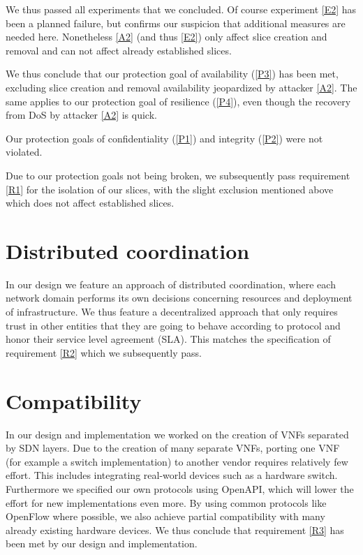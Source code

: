 We thus passed all experiments that we concluded. Of course experiment \ref{E2} has been a planned failure, but confirms our suspicion that additional measures are needed here. Nonetheless \ref{A2} (and thus \ref{E2}) only affect slice creation and removal and can not affect already established slices.

We thus conclude that our protection goal of availability (\ref{P3}) has been met, excluding slice creation and removal availability jeopardized by attacker \ref{A2}. The same applies to our protection goal of resilience (\ref{P4}), even though the recovery from DoS by attacker \ref{A2} is quick.

Our protection goals of confidentiality (\ref{P1}) and integrity (\ref{P2}) were not violated.

Due to our protection goals not being broken, we subsequently pass requirement \ref{R1} for the isolation of our slices, with the slight exclusion mentioned above which does not affect established slices.

\section{Distributed coordination}
In our design we feature an approach of distributed coordination, where each network domain performs its own decisions concerning resources and deployment of infrastructure. We thus feature a decentralized approach that only requires trust in other entities that they are going to behave according to protocol and honor their service level agreement (SLA). This matches the specification of requirement \ref{R2} which we subsequently pass.

\section{Compatibility}
In our design and implementation we worked on the creation of VNFs separated by SDN layers. Due to the creation of many separate VNFs, porting one VNF (for example a switch implementation) to another vendor requires relatively few effort. This includes integrating real-world devices such as a hardware switch. Furthermore we specified our own protocols using OpenAPI, which will lower the effort for new implementations even more. By using common protocols like OpenFlow where possible, we also achieve partial compatibility with many already existing hardware devices. We thus conclude that requirement \ref{R3} has been met by our design and implementation.

